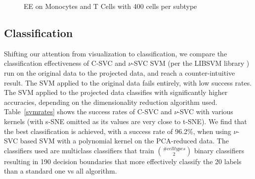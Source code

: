 \documentclass{article}
\begin{document}
\begin{figure}[h!]
\vskip 0.2in
\begin{center}
\quad
{}\quad
\end{center}
\caption{EE on Monocytes and T Cells with 400 cells per subtype}
\label{EEmonocytesandtcells}
\vskip -0.2in
\end{figure}

\subsection{Classification}
Shifting our attention from visualization to classification, we compare the classification effectiveness of C-SVC and $\nu$-SVC SVM (per the LIBSVM library \cite{Chang:2011dt}) run on the original data to the projected data, and reach a counter-intuitive result. The SVM applied to the original data fails entirely, with low success rates. The SVM applied to the projected data classifies with significantly higher accuracies, depending on the dimensionality reduction algorithm used. Table~\ref{svmrates} shows the success rates of C-SVC and $\nu$-SVC with various kernels (with s-SNE omitted as its values are very close to t-SNE). We find that the best classification is achieved, with a success rate of 96.2\%, when using $\nu$-SVC based SVM with a polynomial kernel on the PCA-reduced data. The classifiers used are multiclass classifiers that train $\binom{\# cell types}{2}$ binary classifiers resulting in 190 decision boundaries that more effectively classify the 20 labels than a standard one vs all algorithm.
\end{document}
